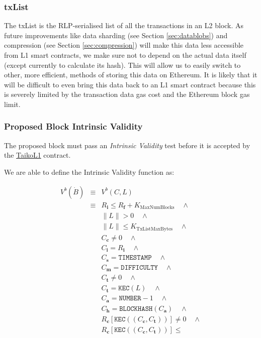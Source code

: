 \documentclass[9pt,oneside]{amsart}
\begin{document}
\begin{multicols}{2}
\subsubsection{txList}\label{sec:txlist}
The txList is the RLP-serialised list of all the transactions in an L2 block. As future improvements like data sharding (see Section \ref{sec:datablobs}) and compression (see Section \ref{sec:compression}) will make this data less accessible from L1 smart contracts, we make sure not to depend on the actual data itself (except currently to calculate its hash). This will allow us to easily switch to other, more efficient, methods of storing this data on Ethereum. It is likely that it will be difficult to even bring this data back to an L1 smart contract because this is severely limited by the transaction data gas cost and the Ethereum block gas limit.

\subsubsection{Proposed Block Intrinsic Validity}
The proposed block must pass an \emph{Intrinsic Validity} test before it is accepted by the \underline{TaikoL1} contract. 

We are able to define the Intrinsic Validity function as:

\begin{eqnarray}
V^{b}(\dot{B}) & \equiv &   V^{b}(C,L)  \\
\nonumber & \equiv &   R_\mathbf{i} \le R_\mathbf{f} + K_\mathrm{MaxNumBlocks}   \quad \wedge \\
\nonumber& & \lVert L \rVert > 0 \quad \wedge \\
\nonumber & & \lVert L \rVert \le K_{\mathrm{TxListMaxBytes}} \quad \wedge \\
\nonumber& & C_{\mathbf{c}} \ne 0   \quad \wedge \\
\nonumber& & C_{\mathbf{i}} = R_\mathbf{i}   \quad \wedge \\
\nonumber& & C_{\mathbf{s}} = \texttt{TIMESTAMP}   \quad \wedge \\
\nonumber& & C_{\mathbf{m}} = \texttt{DIFFICULTY}   \quad \wedge \\
\nonumber& & C_{\mathbf{t}} \ne 0   \quad \wedge \\
\nonumber& & C_{\mathbf{t}} = \texttt{KEC}(L)   \quad \wedge \\
\nonumber& & C_{\mathbf{a}} = \texttt{NUMBER} - 1   \quad \wedge \\
\nonumber& & C_{\mathbf{h}} = \texttt{BLOCKHASH}(C_{\mathbf{a}})   \quad \wedge \\
\nonumber& & R_{\mathbf{c}}[\texttt{KEC}((C_{\mathbf{c}}, C_{\mathbf{t}}))] \ne 0  \quad \wedge \\
\nonumber& & R_{\mathbf{c}}[\texttt{KEC}((C_{\mathbf{c}}, C_{\mathbf{t}}))] \le  \\
\end{eqnarray}


\end{multicols}
\end{document}
